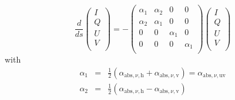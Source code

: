 \documentclass{report}
\begin{document}
\begin{equation}
\frac{d}{ds}
\left(\begin{matrix}
I \\
Q \\
U \\
V \\
\end{matrix}\right)
= - 
\left(\begin{matrix}
\alpha_1 & \alpha_2 & 0 & 0 \\
\alpha_2 & \alpha_1 & 0 & 0  \\
0 & 0 & \alpha_1 & 0 \\
0 & 0 & 0 & \alpha_1 \\
\end{matrix}\right)
\left(\begin{matrix}
I \\
Q \\
U \\
V \\
\end{matrix}\right)
\end{equation}
with
\begin{eqnarray}
\alpha_1 &=& \frac{1}{2}\left(\alpha_{\mathrm{abs},\nu,\mathrm{h}}+\alpha_{\mathrm{abs},\nu,\mathrm{v}}\right) 
= \alpha_{\mathrm{abs},\nu,\mathrm{uv}}\\
\alpha_2 &=& \frac{1}{2}\left(\alpha_{\mathrm{abs},\nu,\mathrm{h}}-\alpha_{\mathrm{abs},\nu,\mathrm{v}}\right) 
\end{eqnarray}
\end{document}
